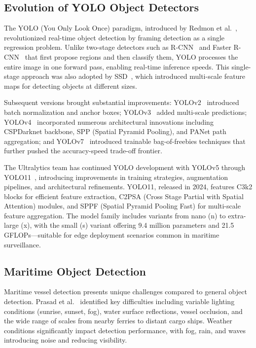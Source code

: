 \documentclass[pdflatex,sn-mathphys-num,Numbered]{sn-jnl}
\begin{document}
\subsection{Evolution of YOLO Object Detectors}\label{subsec:yolo-evolution}

The YOLO (You Only Look Once) paradigm, introduced by Redmon et al.~\cite{redmon2016yolo}, revolutionized real-time object detection by framing detection as a single regression problem. Unlike two-stage detectors such as R-CNN~\cite{girshick2014rcnn} and Faster R-CNN~\cite{ren2015fasterrcnn} that first propose regions and then classify them, YOLO processes the entire image in one forward pass, enabling real-time inference speeds. This single-stage approach was also adopted by SSD~\cite{liu2016ssd}, which introduced multi-scale feature maps for detecting objects at different sizes.

Subsequent versions brought substantial improvements: YOLOv2~\cite{redmon2017yolo9000} introduced batch normalization and anchor boxes; YOLOv3~\cite{redmon2018yolov3} added multi-scale predictions; YOLOv4~\cite{bochkovskiy2020yolov4} incorporated numerous architectural innovations including CSPDarknet backbone, SPP (Spatial Pyramid Pooling), and PANet path aggregation; and YOLOv7~\cite{wang2023yolov7} introduced trainable bag-of-freebies techniques that further pushed the accuracy-speed trade-off frontier.

The Ultralytics team has continued YOLO development with YOLOv5 through YOLO11~\cite{ultralytics2024yolo11}, introducing improvements in training strategies, augmentation pipelines, and architectural refinements. YOLO11, released in 2024, features C3k2 blocks for efficient feature extraction, C2PSA (Cross Stage Partial with Spatial Attention) modules, and SPPF (Spatial Pyramid Pooling Fast) for multi-scale feature aggregation. The model family includes variants from nano (n) to extra-large (x), with the small (s) variant offering 9.4 million parameters and 21.5 GFLOPs---suitable for edge deployment scenarios common in maritime surveillance.

\subsection{Maritime Object Detection}\label{subsec:maritime-detection}

Maritime vessel detection presents unique challenges compared to general object detection. Prasad et al.~\cite{prasad2017video} identified key difficulties including variable lighting conditions (sunrise, sunset, fog), water surface reflections, vessel occlusion, and the wide range of scales from nearby ferries to distant cargo ships. Weather conditions significantly impact detection performance, with fog, rain, and waves introducing noise and reducing visibility.
\end{document}
